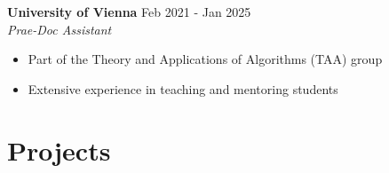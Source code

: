 \documentclass[letterpaper, 10pt]{article}
\newcommand{\bulletSpace}{\vspace{-4pt}}
\newcommand{\secStartSpace}{\vspace{3pt}}
\newcommand{\secEndSpace}{\vspace{5pt}}
\newcommand{\workHeader}[3]{
\noindent \large{\textbf{\textcolor{TextColor}{#1}}} \hfill \normalsize{#3}\vspace{2pt}\\
	\textit{#2}\vspace{-2pt}
}
\newcommand{\workSubHeader}[2]{
    \noindent \textit{#1} \hfill \normalsize{#2}
	\vspace{-2pt}
}
\newcommand{\boldlarger}[1]{{\large\textbf{\color{white}{#1}}}}
\newcommand{\justlarge}[1]{{\large \textbf{#1}}}
\begin{document}
\begin{addmargin}[0.5em]{1em}
	\workHeader{University of Vienna}{Prae-Doc Assistant}{Feb 2021 - Jan 2025}
	\begin{itemize}
		\item Part of the Theory and Applications of Algorithms (TAA) group
		\item Extensive experience in teaching and mentoring students %
	\end{itemize}
		
		      \bulletSpace
\end{addmargin}
\secEndSpace



\section{\color{blue} \textbf{Projects}}
\secStartSpace
\end{document}
